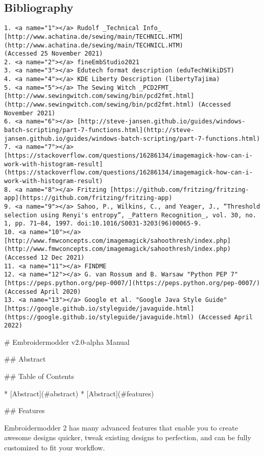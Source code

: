 \documentclass[a4paper, 11pt]{report}
\begin{document}
\subsection{Bibliography}

\begin{verbatim}
1. <a name="1"></a> Rudolf _Technical Info_ [http://www.achatina.de/sewing/main/TECHNICL.HTM](http://www.achatina.de/sewing/main/TECHNICL.HTM)
(Accessed 25 November 2021)
2. <a name="2"></a> fineEmbStudio2021
3. <a name="3"></a> Edutech format description (eduTechWikiDST)
4. <a name="4"></a> KDE Liberty Description (libertyTajima)
5. <a name="5"></a> The Sewing Witch _PCD2FMT_ [http://www.sewingwitch.com/sewing/bin/pcd2fmt.html](http://www.sewingwitch.com/sewing/bin/pcd2fmt.html) (Accessed November 2021)
6. <a name="6"></a> [http://steve-jansen.github.io/guides/windows-batch-scripting/part-7-functions.html](http://steve-jansen.github.io/guides/windows-batch-scripting/part-7-functions.html)
7. <a name="7"></a> [https://stackoverflow.com/questions/16286134/imagemagick-how-can-i-work-with-histogram-result](https://stackoverflow.com/questions/16286134/imagemagick-how-can-i-work-with-histogram-result)
8. <a name="8"></a> Fritzing [https://github.com/fritzing/fritzing-app](https://github.com/fritzing/fritzing-app)
9. <a name="9"></a> Sahoo, P., Wilkins, C., and Yeager, J., “Threshold selection using Renyi's entropy”, _Pattern Recognition_, vol. 30, no. 1, pp. 71–84, 1997. doi:10.1016/S0031-3203(96)00065-9.
10. <a name="10"></a> [http://www.fmwconcepts.com/imagemagick/sahoothresh/index.php](http://www.fmwconcepts.com/imagemagick/sahoothresh/index.php) (Accessed 12 Dec 2021)
11. <a name="11"></a> FINDME
12. <a name="12"></a> G. van Rossum and B. Warsaw "Python PEP 7" [https://peps.python.org/pep-0007/](https://peps.python.org/pep-0007/) (Accessed April 2020)
13. <a name="13"></a> Google et al. "Google Java Style Guide" [https://google.github.io/styleguide/javaguide.html](https://google.github.io/styleguide/javaguide.html) (Accessed April 2022)
\end{verbatim}

# Embroidermodder v2.0-alpha Manual

## Abstract



## Table of Contents

* [Abstract](#abstract)
* [Abstract](#features)

## Features

Embroidermodder 2 has many advanced features that enable you to create awesome designs quicker, tweak existing designs to perfection, and can be fully customized to fit your workflow.
\end{document}
